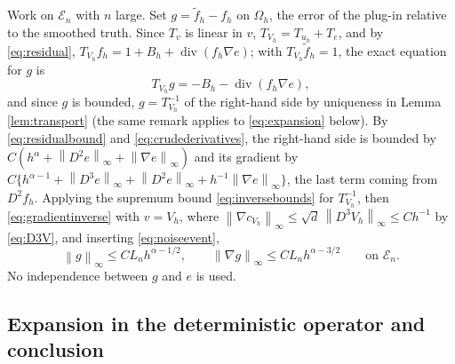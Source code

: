 \documentclass[11pt]{article}
\numberwithin{equation}{section}
\newcommand{\norm}[1]{\left\|#1\right\|}
\newcommand{\diver}{\operatorname{div}}
\begin{document}
Work on $\mathcal E_n$ with $n$ large. Set $g=\widetilde f_h-f_h$ on
$\Omega_h$, the error of the plug-in relative to the smoothed truth.
Since $T_v$ is linear in $v$, $T_{V_h}=T_{u_h}+T_e$, and by
\eqref{eq:residual},
$T_{V_h}f_h=1+B_h+\diver(f_h\nabla e)$; with $T_{V_h}\widetilde f_h=1$,
the exact equation for $g$ is
\begin{equation}\label{eq:gequation}
 T_{V_h}g=-B_h-\diver(f_h\nabla e),
\end{equation}
and since $g$ is bounded, $g=T_{V_h}^{-1}$ of the right-hand side by
uniqueness in Lemma \ref{lem:transport} (the same remark applies to
\eqref{eq:expansion} below). By \eqref{eq:residualbound} and
\eqref{eq:crudederivatives}, the right-hand side is bounded by
$C(h^\alpha+\norm{D^2e}_\infty+\norm{\nabla e}_\infty)$ and its
gradient by
$C\{h^{\alpha-1}+\norm{D^3e}_\infty+\norm{D^2e}_\infty
+h^{-1}\norm{\nabla e}_\infty\}$, the last term coming from $D^2f_h$.
Applying the supremum bound \eqref{eq:inversebounds} for
$T_{V_h}^{-1}$, then \eqref{eq:gradientinverse} with $v=V_h$, where
$\norm{\nabla c_{V_h}}_\infty\le\sqrt d\,\norm{D^3V_h}_\infty\le Ch^{-1}$
by \eqref{eq:D3V}, and inserting \eqref{eq:noiseevent},
\begin{equation}\label{eq:gbounds}
 \norm g_\infty\le CL_nh^{\alpha-1/2},
 \qquad \norm{\nabla g}_\infty\le CL_nh^{\alpha-3/2}
 \qquad\text{on }\mathcal E_n .
\end{equation}
No independence between $g$ and $e$ is used.

\subsection{Expansion in the deterministic operator and conclusion}
\end{document}
